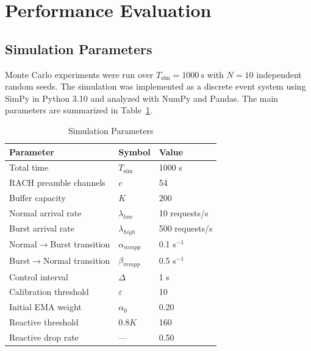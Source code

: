 \documentclass[conference]{IEEEtran}
\begin{document}
\section{Performance Evaluation}

\subsection{Simulation Parameters}

Monte Carlo experiments were run over $T_{\mathrm{sim}} = 1000\ \mathrm{s}$ with $N = 10$ independent random seeds. The simulation was implemented as a discrete event system using SimPy in Python 3.10 and analyzed with NumPy and Pandas. The main parameters are summarized in Table~\ref{tab:params}.

\begin{table}[t]
\caption{Simulation Parameters}
\label{tab:params}
\begin{center}
\begin{tabular}{lll}
\toprule
\textbf{Parameter} & \textbf{Symbol} & \textbf{Value} \\
\midrule
Total time                  & $T_{\mathrm{sim}}$ & 1000 s \\
RACH preamble channels      & $c$                & 54 \\
Buffer capacity             & $K$                & 200 \\
Normal arrival rate         & $\lambda_{low}$   & 10 requests/s \\
Burst arrival rate          & $\lambda_{high}$  & 500 requests/s \\
Normal$\to$Burst transition & $\alpha_{mmpp}$   & 0.1 s$^{-1}$ \\
Burst$\to$Normal transition & $\beta_{mmpp}$    & 0.5 s$^{-1}$ \\
Control interval            & $\Delta$          & 1 s \\
Calibration threshold       & $\varepsilon$     & 10 \\
Initial EMA weight          & $\alpha_0$        & 0.20 \\
Reactive threshold          & $0.8K$             & 160 \\
Reactive drop rate          & ---                & 0.50 \\
\bottomrule
\end{tabular}
\end{center}
\end{table}
\end{document}
